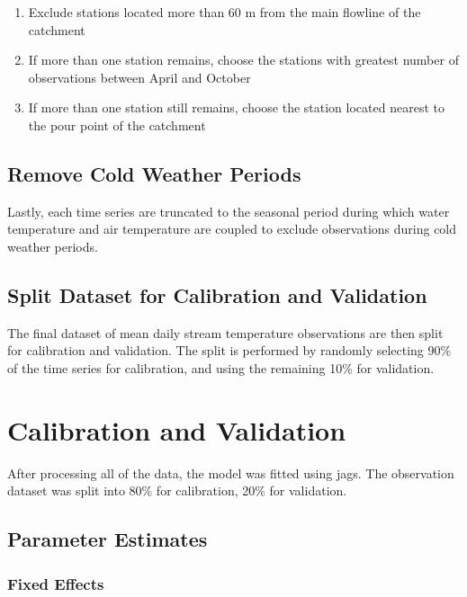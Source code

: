 \documentclass[
]{book}
\providecommand{\tightlist}{%
  \setlength{\itemsep}{0pt}\setlength{\parskip}{0pt}}
\begin{document}
\begin{enumerate}
\def\labelenumi{\arabic{enumi}.}
\tightlist
\item
  Exclude stations located more than 60 m from the main flowline of the catchment
\item
  If more than one station remains, choose the stations with greatest number of observations between April and October
\item
  If more than one station still remains, choose the station located nearest to the pour point of the catchment
\end{enumerate}

\section{Remove Cold Weather Periods}\label{remove-cold-weather-periods}

Lastly, each time series are truncated to the seasonal period during which water temperature and air temperature are coupled to exclude observations during cold weather periods.

\section{Split Dataset for Calibration and Validation}\label{split-dataset-for-calibration-and-validation}

The final dataset of mean daily stream temperature observations are then split for calibration and validation. The split is performed by randomly selecting 90\% of the time series for calibration, and using the remaining 10\% for validation.

\chapter{Calibration and Validation}\label{calibration-and-validation}

After processing all of the data, the model was fitted using jags. The observation dataset was split into 80\% for calibration, 20\% for validation.

\section{Parameter Estimates}\label{parameter-estimates}

\subsection{Fixed Effects}\label{fixed-effects-1}
\end{document}
